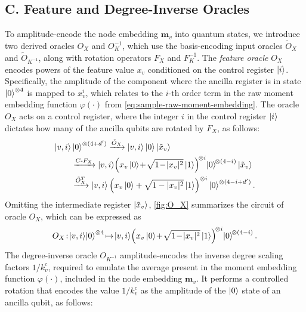 \documentclass[
  reprint,
  superscriptaddress,
  amsmath,amssymb,
  aps,prl,
]{revtex4-2}
\begin{document}
\subsection{C. Feature and Degree-Inverse Oracles}
%
%
\noindent To amplitude-encode the node embedding \(\boldsymbol m_v\) into quantum states, we introduce two derived oracles \(O_X\) and \(O_K^{-1}\), which use the basis-encoding input oracles \(\tilde O_X\) and \(\tilde O_{K^{-1}}\), along with rotation operators \(F_X\) and \(F_K^{-1}\).
The \textit{feature oracle} \(O_X\) encodes powers of the feature value \(x_v\) conditioned on the control register \(\ket{i}\). Specifically, the amplitude of the component where the ancilla register is in state \(\ket{0}^{\otimes 4}\) is mapped to \(x_v^i\), which relates to the \(i\)-th order term in the raw moment embedding function \(\varphi(\cdot)\) from \cref{eq:sample-raw-moment-embedding}.
%
The oracle \(O_X\) acts on a control register, where the integer \(i\) in the control register \(\ket i\) dictates how many of the ancilla qubits are rotated by \(F_X\), as follows:
%
\noindent 
\begin{align}
\ket{v,i} &\ket{0}^{\otimes (4+d')} 
\xrightarrow{\tilde{O}_X} 
\ket{v,i} \ket{0} \ket{\tilde{x}_v} \nonumber \\
&\xrightarrow{C\text{-}F_X} 
\ket{v,i}\!\left(x_v\ket{0}\!+\!\sqrt{1\!-\!|x_v|^2}\ket{1}\right)^{\!\otimes i}\!\ket{0}^{\!\otimes (4 - i)}\ket{\tilde{x}_v} \nonumber\\
&\xrightarrow{\tilde{O}_X^{T}} 
\ket{v,i} \left( x_v \ket{0} + \sqrt{1 - |x_v|^2} \ket{1}\right)^{\otimes i} \ket{0}^{\otimes (4 - i + d')}.
\end{align}
Omitting the intermediate register \(\ket{\tilde{x}_v}\), \cref{fig:O_X} summarizes the circuit of oracle \(O_X\), which can be expressed as
\begin{align}
O_{X}\! :\!\ket{v,i}\!\ket{0}^{\otimes 4} \!\mapsto \!\ket{v,i}\!\left(x_v\ket{0}\!+\!\sqrt{1\!-\!|x_v|^2}\ket{1}\right)^{\!\otimes i}\!\ket{0}^{\!\otimes (4 - i)}.
\end{align}
The degree-inverse oracle \(O_{K^{-1}}\) amplitude-encodes the inverse degree scaling factors \(1/k_v^c\), required to emulate the average present in the moment embedding function \(\varphi(\cdot)\), included in the node embedding \(\boldsymbol m_v\). It performs a controlled rotation that encodes the value \(1/k_v^c\) as the amplitude of the \(\ket{0}\) state of an ancilla qubit, as follows:
\end{document}
